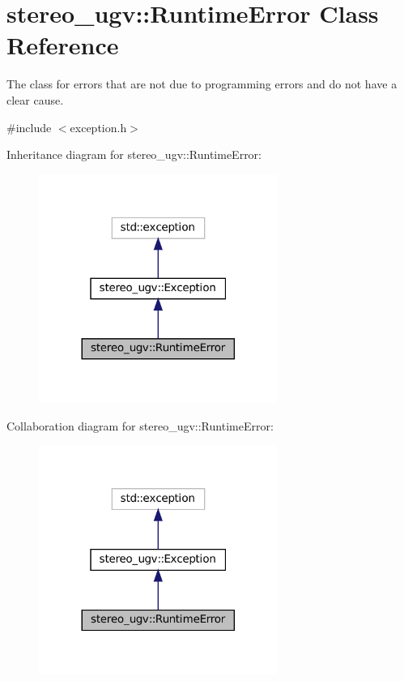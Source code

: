 \hypertarget{classstereo__ugv_1_1RuntimeError}{}\section{stereo\+\_\+ugv\+:\+:Runtime\+Error Class Reference}
\label{classstereo__ugv_1_1RuntimeError}


The class for errors that are not due to programming errors and do not have a clear cause.  




{\ttfamily \#include $<$exception.\+h$>$}



Inheritance diagram for stereo\+\_\+ugv\+:\+:Runtime\+Error\+:\nopagebreak
\begin{figure}[H]
\begin{center}
\leavevmode
\includegraphics[width=221pt]{classstereo__ugv_1_1RuntimeError__inherit__graph}
\end{center}
\end{figure}


Collaboration diagram for stereo\+\_\+ugv\+:\+:Runtime\+Error\+:\nopagebreak
\begin{figure}[H]
\begin{center}
\leavevmode
\includegraphics[width=221pt]{classstereo__ugv_1_1RuntimeError__coll__graph}
\end{center}
\end{figure}
